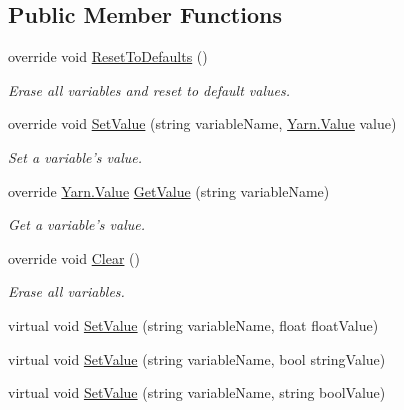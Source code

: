 \subsection*{Public Member Functions}
\begin{DoxyCompactItemize}
\item 
override void \hyperlink{a00087_a3a05d66cdacadb2e9b618cd0aef45f84}{Reset\-To\-Defaults} ()
\begin{DoxyCompactList}\small\item\em Erase all variables and reset to default values. \end{DoxyCompactList}\item 
override void \hyperlink{a00087_ac4265c1c9da485f13a6b05784b0f668d}{Set\-Value} (string variable\-Name, \hyperlink{a00167}{Yarn.\-Value} value)
\begin{DoxyCompactList}\small\item\em Set a variable's value. \end{DoxyCompactList}\item 
override \hyperlink{a00167}{Yarn.\-Value} \hyperlink{a00087_a741593be1a299dcc2136f05b9b4a995a}{Get\-Value} (string variable\-Name)
\begin{DoxyCompactList}\small\item\em Get a variable's value. \end{DoxyCompactList}\item 
override void \hyperlink{a00087_a0ce614bee8d5b220500fb765390b4ca3}{Clear} ()
\begin{DoxyCompactList}\small\item\em Erase all variables. \end{DoxyCompactList}\item 
virtual void \hyperlink{a00170_a869fa2dfd390c1ec63735b5763ba4d77}{Set\-Value} (string variable\-Name, float float\-Value)
\item 
virtual void \hyperlink{a00170_a08ff36ec352a979b5db074f66ec9e189}{Set\-Value} (string variable\-Name, bool string\-Value)
\item 
virtual void \hyperlink{a00170_a25df235b5446e93d5236a5fd5c17f6dd}{Set\-Value} (string variable\-Name, string bool\-Value)
\end{DoxyCompactItemize}
